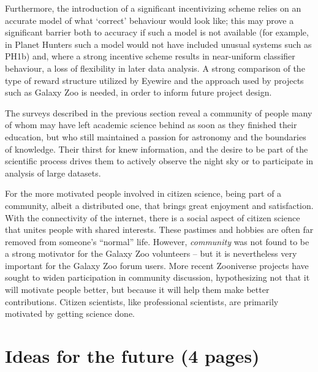 \documentclass{ar2e}
\begin{document}
Furthermore, the introduction of a significant incentivizing scheme relies on an
accurate model of what `correct' behaviour would look like; this may prove a
significant barrier both to accuracy if such a model is not available (for
example, in Planet Hunters such a model would not have included unusual systems
such as PH1b) and, where a strong incentive scheme results in near-uniform
classifier behaviour, a loss of flexibility in later data analysis. 
A strong comparison of the type of reward structure utilized by Eyewire and the
approach used by projects such as Galaxy Zoo is needed, in order to
inform future project design. 

The surveys described in the previous section reveal a community of people many
of whom may have left   academic science behind as soon as they finished their 
education, but who still maintained a passion for astronomy and the  boundaries
of knowledge.  Their thirst for knew information, and the  desire to be part of
the  scientific process drives them to actively observe the  night sky or to
participate in analysis of large datasets.  

For the more motivated people involved in citizen science, being part of a
community,  albeit a distributed one, that brings great enjoyment and
satisfaction.  With the connectivity of the internet, there is a social  aspect
of citizen science that unites people with shared interests.   These pastimes
and hobbies are often far removed from someone's ``normal''  life. However, {\it
community} was not found to be a strong motivator for the Galaxy Zoo volunteers
-- but it is nevertheless very important for the Galaxy Zoo forum users. More
recent Zooniverse projects have sought to widen participation in community
discussion, hypothesizing not that it will motivate people better, but because
it will help them make better contributions. Citizen scientists, like
professional scientists, are primarily motivated by getting science done.






\section{Ideas for the future (4 pages)}
\label{sec:future}
\end{document}
